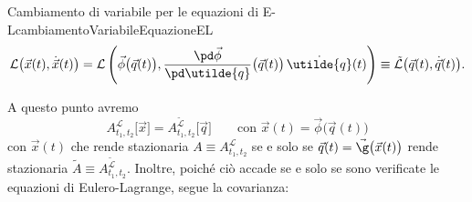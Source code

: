 \begin{remark}{Cambiamento di variabile per le equazioni di E-L}{cambiamentoVariabileEquazioneEL}
	\[
		\mathcal{L}\big(\vec{x}(t),\dot{\vec{x}}(t)\big) = \mathcal{L}\left(\vec{\phi}\big(\vec{q}(t)\big),\frac{\pd\vec{\phi}}{\pd\utilde{q}}\big(\vec{q}(t)\big)\,\dot{\utilde{q}}(t)\right) \equiv \tilde{\mathcal{L}}\big(\vec{q}(t),\dot{\vec{q}}(t)\big).
	\]
\end{remark}
\noindent
A questo punto avremo
\[
	A_{t_1,t_2}^{\mathcal{L}}\big[\vec{x}\big] = A_{t_1,t_2}^{\tilde{\mathcal{L}}}\big[\vec{q}\big] \qquad\text{con }\vec{x}(t) = \vec{\phi}\big(\vec{q}(t)\big)
\]
con \(\vec{x}(t)\) che rende stazionaria \(A\equiv A_{t_1,t_2}^{\mathcal{L}}\) se e solo se \(\vec{q}(t)=\vec{\g}\big(\vec{x}(t)\big)\) rende stazionaria \(\tilde{A}\equiv A_{t_1,t_2}^{\tilde{\mathcal{L}}}\).
Inoltre, poiché ciò accade se e solo se sono verificate le equazioni di Eulero-Lagrange, segue la covarianza:


